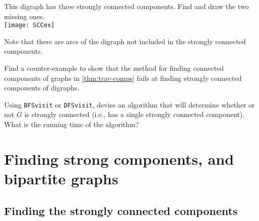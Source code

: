 \begin{Boxample}[0]\label{eg:scc}
This digraph has three strongly connected components. Find and draw the two missing ones.\\

\texttt{[image: SCCex]}

Note that there are arcs of the digraph not included in the strongly connected components.
\end{Boxample}

\begin{Boxample}[4]
Find a counter-example to show that the method for finding connected components of graphs 
in \cref{thm:trav-comps} fails at finding strongly connected components of digraphs.
\end{Boxample}

\begin{Boxample}[4]
Using \texttt{BFSvisit} or \texttt{DFSvisit}, devise an algorithm that will determine whether or not $G$ is strongly connected (i.e., has a single strongly connected component). What is the running time of the algorithm?
\end{Boxample}


%
%


\chapter{Finding strong components, and bipartite graphs} %

\section{Finding the strongly connected components}


